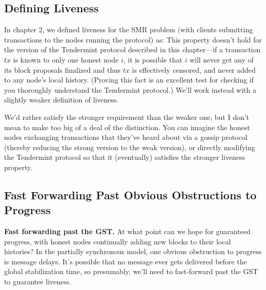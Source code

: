 \subsection{Defining Liveness}
In chapter 2, we defined liveness for the SMR problem (with clients submitting transactions
to the nodes running the protocol) as:
This property doesn't hold for the version of the Tendermint protocol described in
this chapter—if a transaction $tx$ is known to only one honest node $i$, it is possible that $i$
will never get any of its block proposals finalized and thus $tx$ is effectively censored, and never added to any node’s local history.
(Proving this fact is an excellent test for checking if you thoroughly understand the Tendermint protocol.) We’ll work instead with a 
slightly weaker definition of liveness.

We’d rather satisfy the stronger requirement than the weaker one, but I don’t
mean to make too big of a deal of the distinction. You can imagine the honest nodes
exchanging transactions that they've heard about via a gossip protocol (thereby reducing
the strong version to the weak version), or directly modifying the Tendermint protocol so
that it (eventually) satisfies the stronger liveness property.

\subsection{Fast Forwarding Past Obvious Obstructions to Progress}
\noindent
\textbf{Fast forwarding past the GST.}
At what point can we hope for guaranteed progress,
with honest nodes continually adding new blocks to their local histories? In the partially
synchronous model, one obvious obstruction to progress is message delays. It’s possible that
no message ever gets delivered before the global stabilization time, so presumably,
we’ll need to fast-forward past the GST to guarantee liveness.\\

